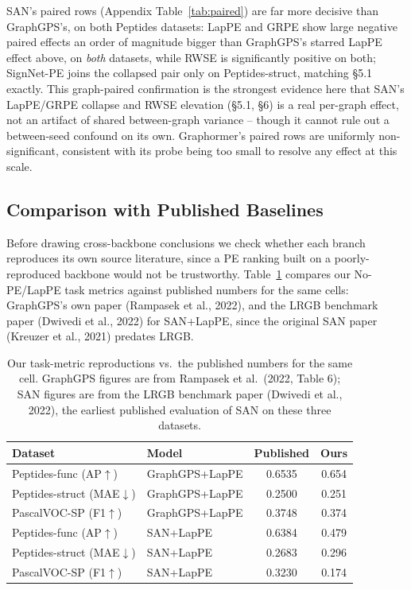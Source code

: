 \documentclass[10pt]{article}
\begin{document}
SAN's paired rows (Appendix Table~\ref{tab:paired}) are far more decisive than GraphGPS's, on both Peptides datasets: LapPE and GRPE show large negative paired effects an order of magnitude bigger than GraphGPS's starred LapPE effect above, on \emph{both} datasets, while RWSE is significantly positive on both; SignNet-PE joins the collapsed pair only on Peptides-struct, matching \S5.1 exactly. This graph-paired confirmation is the strongest evidence here that SAN's LapPE/GRPE collapse and RWSE elevation (\S5.1, \S6) is a real per-graph effect, not an artifact of shared between-graph variance -- though it cannot rule out a between-seed confound on its own. Graphormer's paired rows are uniformly non-significant, consistent with its probe being too small to resolve any effect at this scale.

\subsection{Comparison with Published Baselines}
\label{sec:litcompare}
Before drawing cross-backbone conclusions we check whether each branch reproduces its own source literature, since a PE ranking built on a poorly-reproduced backbone would not be trustworthy. Table~\ref{tab:litcompare} compares our No-PE/LapPE task metrics against published numbers for the same cells: GraphGPS's own paper (Rampasek et al., 2022), and the LRGB benchmark paper (Dwivedi et al., 2022) for SAN+LapPE, since the original SAN paper (Kreuzer et al., 2021) predates LRGB.

\begin{table}[h]
\centering\footnotesize
\setlength{\tabcolsep}{3pt}
\begin{tabular}{llcc}
\toprule
\textbf{Dataset} & \textbf{Model} & \textbf{Published} & \textbf{Ours} \\
\midrule
Peptides-func (AP$\uparrow$) & GraphGPS+LapPE & 0.6535 & 0.654 \\
Peptides-struct (MAE$\downarrow$) & GraphGPS+LapPE & 0.2500 & 0.251 \\
PascalVOC-SP (F1$\uparrow$) & GraphGPS+LapPE & 0.3748 & 0.374 \\
\midrule
Peptides-func (AP$\uparrow$) & SAN+LapPE & 0.6384 & 0.479 \\
Peptides-struct (MAE$\downarrow$) & SAN+LapPE & 0.2683 & 0.296 \\
PascalVOC-SP (F1$\uparrow$) & SAN+LapPE & 0.3230 & 0.174 \\
\bottomrule
\end{tabular}
\caption{Our task-metric reproductions vs.\ the published numbers for the same cell. GraphGPS figures are from Rampasek et al.\ (2022, Table 6); SAN figures are from the LRGB benchmark paper (Dwivedi et al., 2022), the earliest published evaluation of SAN on these three datasets.}
\label{tab:litcompare}
\end{table}
\end{document}
